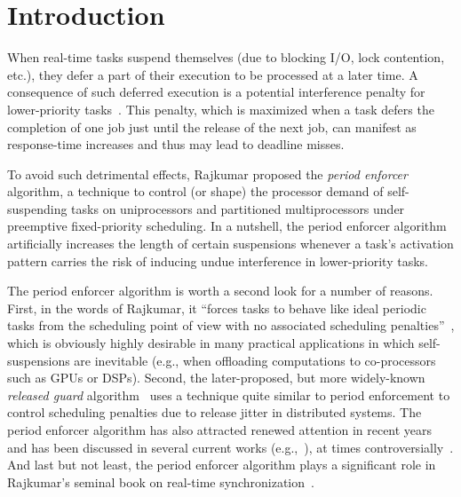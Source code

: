 


\section{Introduction} 
When real-time tasks suspend themselves (due to blocking I/O, lock contention, etc.), they defer a part of their execution to be processed at a later time. A consequence of such deferred execution is a potential interference penalty for lower-priority tasks~\cite{LSS:87,LSST:91,Ra:90,ABRTW:93,SLS:95}. This penalty, which is maximized when a task defers the completion of one job just until the release of the next job, can manifest as response-time increases and thus may lead to deadline misses.

To avoid such detrimental effects,  Rajkumar \cite{Raj:suspension1991} proposed the \emph{period enforcer} algorithm,  a technique to control (or shape) the processor demand of self-suspending tasks on uniprocessors and partitioned multiprocessors under preemptive fixed-priority scheduling. In a nutshell, the period enforcer algorithm artificially increases the length of certain suspensions whenever a task's activation pattern carries the risk of inducing undue interference in lower-priority tasks. 

The period enforcer algorithm is worth a second look for a number of reasons. First, in the words of Rajkumar, it ``forces tasks to behave like ideal periodic tasks from the scheduling point of view with no associated scheduling penalties''~\cite{Raj:suspension1991}, which is obviously highly desirable in many practical applications in which self-suspensions are inevitable (e.g., when offloading computations to co-processors such as GPUs or DSPs). Second, the later-proposed, but more widely-known \emph{released guard} algorithm~\cite{SL:96} uses a technique quite similar to period enforcement to control scheduling penalties due to release jitter in distributed systems. The period enforcer algorithm has also attracted renewed attention in recent years and has been discussed in several current works  (e.g.,~\cite{DBLP:conf/rtss/ChenL14,LNR:09,LR:10,Lak:11,LC:14,KANR:13,HY:11,CA:09,CA:10,CA:10b}), at times controversially~\cite{BA:08a}. And last but not least, the period enforcer algorithm plays a significant role in Rajkumar's seminal book on   real-time  synchronization~\cite{Raj:91}. 

